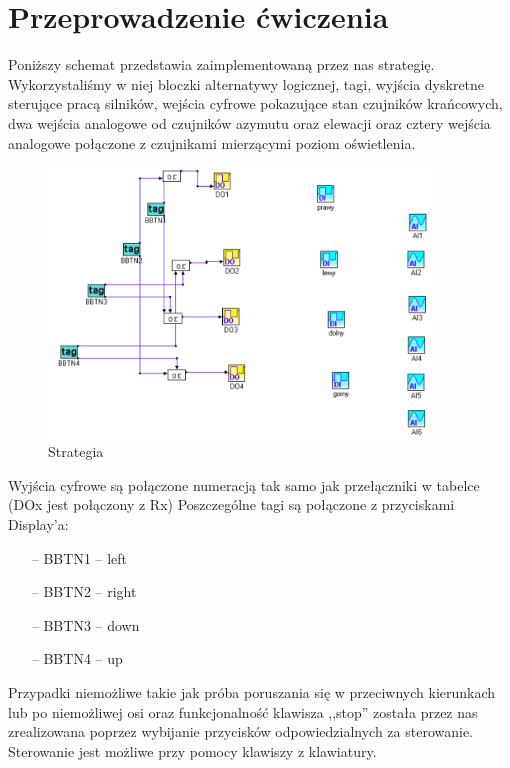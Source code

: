 \documentclass[a4paper, 12pt]{article}
\begin{document}
	\section{Przeprowadzenie ćwiczenia}
		Poniższy schemat przedstawia zaimplementowaną przez nas strategię. Wykorzystaliśmy w niej bloczki alternatywy logicznej, tagi, wyjścia dyskretne sterujące pracą silników, wejścia cyfrowe pokazujące stan czujników krańcowych, dwa wejścia analogowe od czujników azymutu oraz elewacji oraz cztery wejścia analogowe połączone z czujnikami mierzącymi poziom oświetlenia.
		\begin{figure}[H]
			\centering
			\includegraphics[width = 0.9\textwidth]{./img/strategy.png}
			\caption{Strategia}
		\end{figure}
		\noindent
		Wyjścia cyfrowe są połączone numeracją tak samo jak przełączniki w tabelce (DOx jest połączony z Rx) Poszczególne tagi są połączone z przyciskami Display'a: 
		\begin{itemize}
			\item[--] BBTN1 -- left
			\item[--] BBTN2 -- right
			\item[--] BBTN3 -- down
			\item[--] BBTN4 -- up
		\end{itemize}
		Przypadki niemożliwe takie jak próba poruszania się w przeciwnych kierunkach lub po niemożliwej osi oraz funkcjonalność klawisza ,,stop'' została przez nas zrealizowana poprzez wybijanie przycisków odpowiedzialnych za sterowanie. Sterowanie jest możliwe przy pomocy klawiszy z klawiatury.
\end{document}
